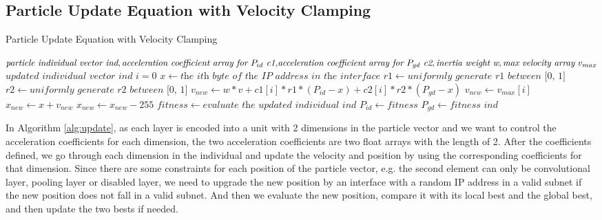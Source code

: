 \documentclass[conference]{IEEEtran}
\begin{document}
\subsection{Particle Update Equation with Velocity Clamping}
\begin{algorithm}
	\caption{Particle Update Equation with Velocity Clamping}
	\label{alg:update}
	\begin{algorithmic}
		\renewcommand{\algorithmicrequire}{\textbf{Input:}}
		\renewcommand{\algorithmicensure}{\textbf{Output:}}
		\REQUIRE $\textit{particle individual vector ind}, \newline \textit{acceleration coefficient array for $P_{id}$ c1,} \newline \textit{acceleration coefficient array for $P_{gd}$ c2}, \newline \textit{inertia weight w}, \newline \textit{max velocity array } v_{max}$
		\ENSURE $\textit{updated individual vector ind}$
			\STATE $i=0$
				\STATE $x \leftarrow \textit{the ith byte of the IP address in the interface}$
				\STATE $r1 \leftarrow \textit{uniformly generate r1 between [0, 1]}$
				\STATE $r2 \leftarrow \textit{uniformly generate r2 between [0, 1]}$
				\STATE $v_{new} \leftarrow w * v + c1[i] * r1 * (P_{id} - x) + c2[i] * r2 * (P_{gd} - x)$
					\STATE $v_{new} \leftarrow v_{max}[i]$
				\ENDIF
				\STATE $x_{new} \leftarrow x + v_{new}$
					\STATE $x_{new} \leftarrow x_{new}-255$
				\ENDIF
			\ENDFOR
		\ENDFOR
		\STATE $fitness \leftarrow \textit{evaluate the updated individual ind}$
			\STATE $P_{id} \leftarrow fitness$
		\ENDIF
		\STATE $P_{gd} \leftarrow fitness$
		\ENDIF
		\RETURN $ind$
	\end{algorithmic}
\end{algorithm}

In Algorithm \ref{alg:update}, as each layer is encoded into a unit with 2 dimensions in the particle vector and we want to control the acceleration coefficients for each dimension, the two acceleration coefficients are two float arrays with the length of 2. 
After the coefficients defined, we go through each dimension in the individual and update the velocity and position by using the corresponding coefficients for that dimension. Since there are some constraints for each position of the particle vector, e.g. the second element can only be convolutional layer, pooling layer or disabled layer, we need to upgrade the new position by an interface with a random IP address in a valid subnet if the new position does not fall in a valid subnet. And then we evaluate the new position, compare it with its local best and the global best, and then update the two bests if needed.
\end{document}
